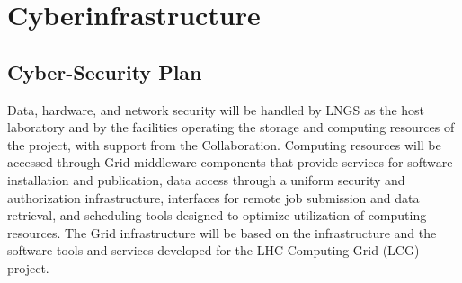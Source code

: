 \section{Cyberinfrastructure}



\subsection{Cyber-Security Plan}

Data, hardware, and network security will be handled by LNGS as the host laboratory and by the facilities operating the storage and computing resources of the project, with support from the Collaboration. Computing resources will be accessed through Grid middleware components that provide services for software installation and publication, data access through a uniform security and authorization infrastructure, interfaces for remote job submission and data retrieval, and scheduling tools designed to optimize utilization of computing resources. The Grid infrastructure will be based on the infrastructure and the software tools and services developed for the LHC Computing Grid (LCG) project. 

